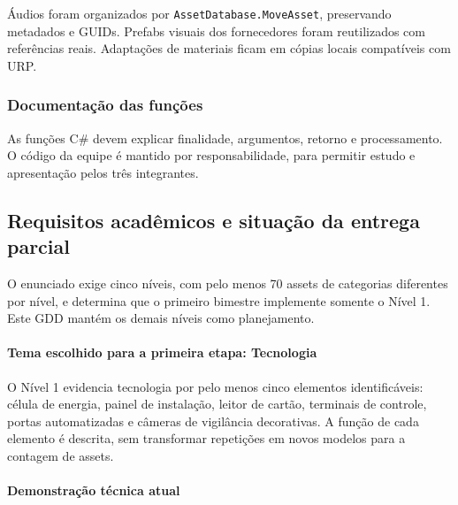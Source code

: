 \documentclass[12pt,a4paper]{article}
\begin{document}
Áudios foram organizados por \texttt{AssetDatabase.MoveAsset},
preservando metadados e GUIDs. Prefabs visuais dos fornecedores
foram reutilizados com referências reais. Adaptações de materiais
ficam em cópias locais compatíveis com URP.

\subsubsection*{Documentação das funções}

As funções C\# devem explicar finalidade, argumentos, retorno e
processamento. O código da equipe é mantido por responsabilidade,
para permitir estudo e apresentação pelos três integrantes.

\subsection{Requisitos acadêmicos e situação da entrega parcial}

O enunciado exige cinco níveis, com pelo menos 70 assets de
categorias diferentes por nível, e determina que o primeiro
bimestre implemente somente o Nível 1. Este GDD mantém os demais
níveis como planejamento.

\paragraph{Tema escolhido para a primeira etapa: Tecnologia}

O Nível 1 evidencia tecnologia por pelo menos cinco elementos
identificáveis: célula de energia, painel de instalação, leitor de
cartão, terminais de controle, portas automatizadas e câmeras de
vigilância decorativas. A função de cada elemento é descrita,
sem transformar repetições em novos modelos para a contagem de assets.

\paragraph{Demonstração técnica atual}
\end{document}
